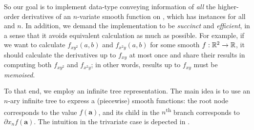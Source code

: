 \documentclass[./rims-smooth-paper.tex]{subfiles}
\begin{document}
So our goal is to implement  data-type conveying information of \emph{all} the higher-order derivatives of an $n$-variate smooth function on , which has  instances for all  and $n$.
In addition, we demand the implementation to be \emph{succinct} and \emph{efficient}, in a sense that it avoids equivalent calculation as much as possible.
For example, if we want to calculate $f_{xy^2}(a,b)$ and $f_{x^2y}(a,b)$ for some smooth $f: \mathbb{R}^2 \to \mathbb{R}$, it should calculate the derivatives up to $f_{xy}$ at most once and share their results in computing both $f_{xy^2}$ and $f_{x^2y}$; in other words, results up to $f_{xy}$ must be \emph{memoised}.

To that end, we employ an infinite tree representation.
The main idea is to use an $n$-ary infinite tree to express a (piecewise) smooth functions: the root node corresponds to the value $f(\boldsymbol{a})$, and its child in the $n$\textsuperscript{th} branch corresponds to $\partial x_n f(\boldsymbol{a})$.
The intuition in the trivariate case is depected in .
\end{document}
